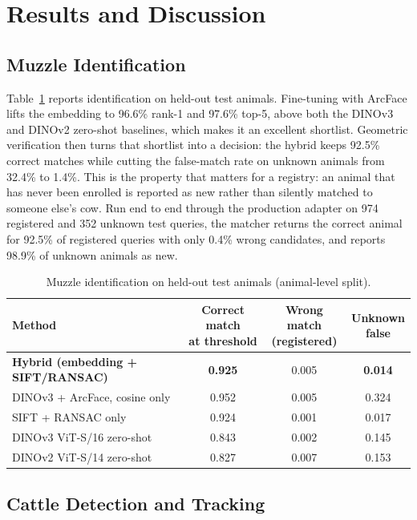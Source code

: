 \documentclass[11pt,letterpaper]{article}
\begin{document}
\section{Results and Discussion}

\subsection{Muzzle Identification}

Table~\ref{tab:muzzle} reports identification on held-out test animals. Fine-tuning with ArcFace lifts the embedding to 96.6\% rank-1 and 97.6\% top-5, above both the DINOv3 and DINOv2 zero-shot baselines, which makes it an excellent shortlist. Geometric verification then turns that shortlist into a decision: the hybrid keeps 92.5\% correct matches while cutting the false-match rate on unknown animals from 32.4\% to 1.4\%. This is the property that matters for a registry: an animal that has never been enrolled is reported as new rather than silently matched to someone else's cow. Run end to end through the production adapter on 974 registered and 352 unknown test queries, the matcher returns the correct animal for 92.5\% of registered queries with only 0.4\% wrong candidates, and reports 98.9\% of unknown animals as new.

\begin{table}[H]
\centering
\caption{Muzzle identification on held-out test animals (animal-level split).}
\label{tab:muzzle}
\small
\setlength{\tabcolsep}{3.5pt}
\begin{tabular}{lccc}
\toprule
Method & \makecell{Correct match\\at threshold} & \makecell{Wrong match\\(registered)} & \makecell{Unknown\\false} \\
\midrule
\textbf{Hybrid (embedding + SIFT/RANSAC)} & \textbf{0.925} & 0.005 & \textbf{0.014} \\
DINOv3 + ArcFace, cosine only & 0.952 & 0.005 & 0.324 \\
SIFT + RANSAC only & 0.924 & 0.001 & 0.017 \\
DINOv3 ViT-S/16 zero-shot & 0.843 & 0.002 & 0.145 \\
DINOv2 ViT-S/14 zero-shot & 0.827 & 0.007 & 0.153 \\
\bottomrule
\end{tabular}
\end{table}

\subsection{Cattle Detection and Tracking}
\end{document}
